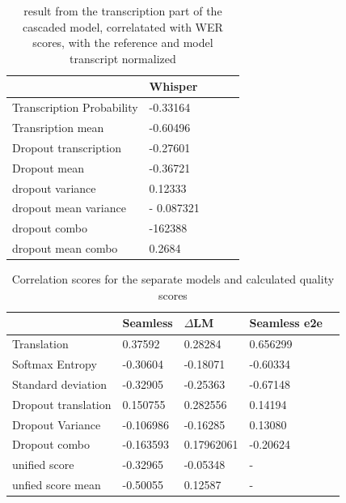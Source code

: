 
\begin{table}[ht]
\centering%
  \begin{tabular}
  {l|llll}
  &  Whisper \\ \hline
  Transcription Probability& -0.33164 \\
  Transription mean & -0.60496 \\ \hline
  Dropout transcription & -0.27601 \\
  Dropout mean & -0.36721 \\
  dropout variance &  0.12333\\
  dropout mean variance & - 0.087321\\
  dropout combo& -162388\\
  dropout mean combo & 0.2684\\
  \end{tabular}

  \caption{result from the transcription part of the cascaded model, correlatated with WER scores, with the reference and model transcript normalized}
    \label{transcription results}
\end{table}

\begin{table}[ht]
\centering%
\begin{tabular}{l|llll}
    & Seamless & $\Delta$LM&  Seamless e2e\\ \hline
Translation & 0.37592 & 0.28284 & 0.656299\\ 
Softmax Entropy & -0.30604   &-0.18071 & -0.60334 \\
Standard deviation & -0.32905  & -0.25363& -0.67148 \\ \hline

Dropout translation & 0.150755& 0.282556& 0.14194\\

Dropout Variance &-0.106986 & -0.16285& 0.13080\\
Dropout combo & -0.163593& 0.17962061& -0.20624\\
\hline
unified score   & -0.32965 & -0.05348 &-\\
unfied score mean& -0.50055& 0.12587& - 
\end{tabular}
\caption{Correlation scores for the separate models and calculated quality scores}
\label{results}
\end{table}


